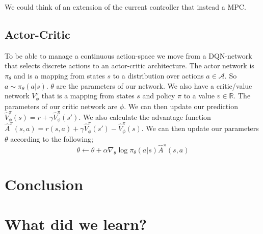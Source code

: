 \documentclass{article}
\begin{document}
We could think of an extension of the current controller that instead a MPC.

\subsection{Actor-Critic}
To be able to manage a continuous action-space we move from a DQN-network that selects discrete actions to an actor-critic architecture. The actor network is $\pi_\theta$ and is a mapping from states $s$ to a distribution over actions $a \in \mathcal{A}$. So $a \sim \pi_\theta(a|s)$. $\theta$ are the parameters of our network. We also have a critic/value network $V_\phi^\pi$ that is a mapping from states $s$ and policy $\pi$ to a value $v \in \mathbb{R}$. The parameters of our critic network are $\phi$.
We can then update our prediction $\hat{V}_\phi^\pi (s)= r + \gamma \hat{V}_\phi^\pi (s')$. We also calculate the advantage function $\hat{A}^\pi (s,a) = r(s,a) + \gamma \hat{V}_\phi^\pi (s') - \hat{V}_\phi^\pi (s).$
We can then update our parameters $\theta$ according to the following;
\[
\theta \leftarrow \theta + \alpha \nabla_\theta \log \pi_\theta (a|s) \hat{A}^\pi (s,a)
\]

\section{Conclusion}

\section{What did we learn?}
\end{document}
